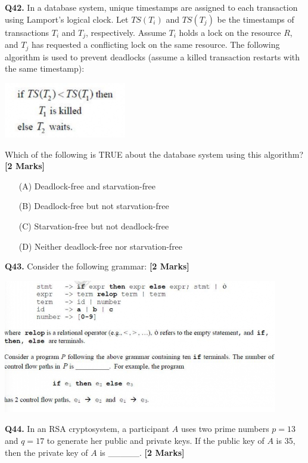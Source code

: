 \documentclass[11pt]{article}
\newcommand{\questionb}[2]{
    \noindent\textbf{Q#2.} #1 \hfill \textbf{[2 Marks]}
}
\begin{document}
\questionb{In a database system, unique timestamps are assigned to each transaction using Lamport’s logical clock.  
Let \( TS(T_i) \) and \( TS(T_j) \) be the timestamps of transactions \( T_i \) and \( T_j \), respectively.  
Assume \( T_i \) holds a lock on the resource \( R \), and \( T_j \) has requested a conflicting lock on the same resource.  
The following algorithm is used to prevent deadlocks (assume a killed transaction restarts with the same timestamp):
\begin{center}
\includegraphics[width=0.4\textwidth]{figures/42.png}
\end{center}
Which of the following is TRUE about the database system using this algorithm?}{42}
\begin{enumerate}
    \item[(A)] Deadlock-free and starvation-free  
    \item[(B)] Deadlock-free but not starvation-free  
    \item[(C)] Starvation-free but not deadlock-free  
    \item[(D)] Neither deadlock-free nor starvation-free  
\end{enumerate}
\vspace{0.5cm}

\questionb{Consider the following grammar:  
}{43}
\begin{center}
\includegraphics[width=0.9\textwidth]{figures/43.png}
\end{center}
\vspace{0.5cm}

\questionb{In an RSA cryptosystem, a participant \( A \) uses two prime numbers \( p = 13 \) and \( q = 17 \) to generate her public and private keys.  
If the public key of \( A \) is 35, then the private key of \( A \) is \_\_\_\_\_.}{44}
\vspace{0.5cm}
\end{document}
